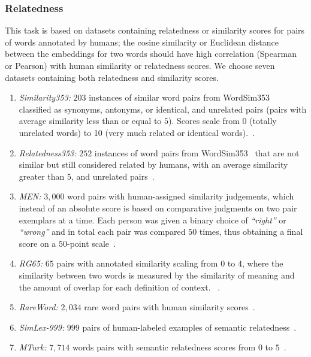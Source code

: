  \subsubsection{Relatedness}
This task is based on datasets containing relatedness or similarity scores for pairs of words annotated by humans; the cosine similarity or Euclidean distance between the embeddings for two words should have high correlation (Spearman or Pearson) with human similarity or relatedness scores. We choose seven datasets containing both relatedness and similarity scores. 
\begin{enumerate}
 \item \emph{Similarity353:} $203$ instances of similar word pairs from WordSim353~ classified as synonyms, antonyms, or identical, and unrelated pairs (pairs with average similarity less than or equal to $5$). Scores scale from 0 (totally unrelated words) to 10 (very much related or identical words).~.
 \item \emph{Relatedness353:} $252$ instances of word pairs from WordSim353~ that are not similar but still considered related by humans, with an average similarity greater than $5$, and unrelated pairs~.
 \item \emph{MEN:} $3,000$ word pairs with human-assigned similarity judgements, which instead of an absolute score is based on comparative judgments on two pair exemplars at a time. Each person was given a binary choice of \emph{``right''} or \emph{``wrong''} and in total each pair was compared $50$ times, thus obtaining a final score on a $50$-point scale~.
 \item \emph{RG65:} $65$ pairs with annotated similarity scaling from $0$ to $4$, where the similarity between two words is measured by the similarity of meaning and the
amount of overlap for each definition of context. ~.
 \item \emph{RareWord:} $2,034$ rare word pairs with human similarity scores~.
 \item \emph{SimLex-999:} $999$ pairs of human-labeled examples of semantic relatedness~.
 \item \emph{MTurk:} $7,714$ words pairs with semantic relatedness scores from
$0$ to $5$~.
\end{enumerate}

